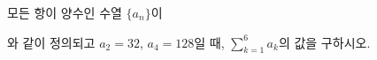모든 항이 양수인 수열 $\{a_n\}$이\par\smallskip{}\par\smallskip\noindent 와 같이 정의되고 $a_2=32$, $a_4=128$일 때, $\displaystyle\sum_{k=1}^{6} a_k$의 값을 구하시오.

